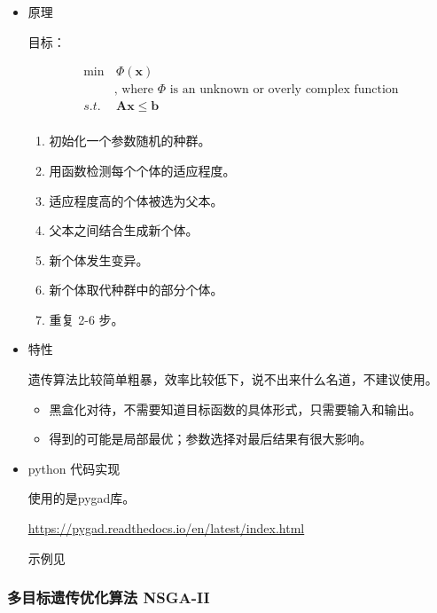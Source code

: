 \documentclass{article}
\begin{document}
\begin{itemize}

\item{原理}

目标：

\begin{equation}
    \begin{split}
        \min &\, \Phi(\mathbf{x}) \\
        & \text{, where $\Phi$ is an unknown or overly complex function}\\
        s.t. &\, \mathbf{Ax} \leqslant \mathbf{b}\\
    \end{split}
\end{equation}

\begin{enumerate}
    \item 初始化一个参数随机的种群。
    \item 用函数检测每个个体的适应程度。
    \item 适应程度高的个体被选为父本。
    \item 父本之间结合生成新个体。
    \item 新个体发生变异。
    \item 新个体取代种群中的部分个体。
    \item 重复 2-6 步。
\end{enumerate}

\item{特性}

遗传算法比较简单粗暴，效率比较低下，说不出来什么名道，不建议使用。

\begin{itemize}
    \item 黑盒化对待，不需要知道目标函数的具体形式，只需要输入和输出。
    \item 得到的可能是局部最优；参数选择对最后结果有很大影响。
\end{itemize}

\item{python 代码实现}

使用的是pygad库。

\url{https://pygad.readthedocs.io/en/latest/index.html}

示例见

\end{itemize}

\subsubsection{多目标遗传优化算法 NSGA-II}
\end{document}
